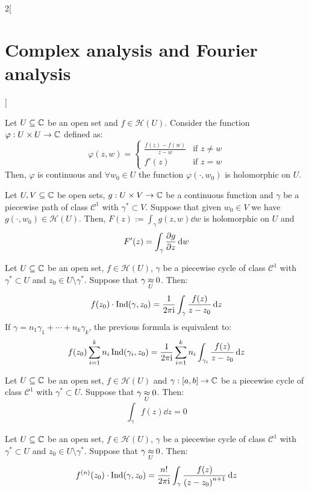 \documentclass[../../../main.tex]{subfiles}
\begin{document}
\begin{multicols}{2}[\section{Complex analysis and Fourier analysis}]
  \begin{lemma}
    Let $U\subseteq\mathbb{C}$ be an open set and $f\in\mathcal{H}(U)$. Consider the function $\varphi:U\times U\rightarrow\mathbb{C}$ defined as:
    $$
      \varphi(z,w)=
      \begin{cases}
        \frac{f(z)-f(w)}{z-w} & \text{if }z\ne w \\
        f'(z)                 & \text{if }z=w
      \end{cases}
    $$
    Then, $\varphi$ is continuous and $\forall w_0\in U$ the function $\varphi(\cdot,w_0)$ is holomorphic on $U$.
  \end{lemma}
  \begin{lemma}
    Let $U,V\subseteq\mathbb{C}$ be open sets, $g:U\times V\rightarrow\mathbb{C}$ be a continuous function and $\gamma$ be a piecewise path of class $\mathcal{C}^1$ with $\gamma^*\subset V$. Suppose that given $w_0\in V$ we have $g(\cdot,w_0)\in\mathcal{H}(U)$. Then, $F(z):=\int_\gamma g(z,w)\dd{w}$ is holomorphic on $U$ and $$F'(z)=\int_\gamma\pdv{g}{z}(z,w)\dd{w}$$
  \end{lemma}
  \begin{theorem}
    Let $U\subseteq\mathbb{C}$ be an open set, $f\in\mathcal{H}(U)$, $\gamma$ be a piecewise cycle of class $\mathcal{C}^1$ with $\gamma^*\subset U$ and $z_0\in U\setminus\gamma^*$. Suppose that $\gamma\mathbin{\underset{U}{\approx}} 0$. Then:
    $$f(z_0)\cdot\operatorname{Ind}(\gamma,z_0)=\frac{1}{2\pi\mathrm{i}}\int_\gamma\frac{f(z)}{z-z_0}\dd{z}$$
    If $\gamma=n_1\gamma_1+\cdots+n_k\gamma_k$, the previous formula is equivalent to:
    $$f(z_0)\sum_{i=1}^kn_i\operatorname{Ind}(\gamma_i,z_0)=\frac{1}{2\pi\mathrm{i}}\sum_{i=1}^kn_i\int_{\gamma_i}\frac{f(z)}{z-z_0}\dd{z}$$
  \end{theorem}
  \begin{theorem}
    Let $U\subseteq \mathbb{C}$ be an open set, $f\in\mathcal{H}(U)$ and $\gamma:[a,b]\rightarrow\mathbb{C}$ be a piecewise cycle of class $\mathcal{C}^1$ with $\gamma^*\subset U$. Suppose that $\gamma\mathbin{\underset{U}{\approx}} 0$. Then: $$\int_\gamma f(z)\dd{z}=0$$
  \end{theorem}
  \begin{corollary}
    Let $U\subseteq\mathbb{C}$ be an open set, $f\in\mathcal{H}(U)$, $\gamma$ be a piecewise cycle of class $\mathcal{C}^1$ with $\gamma^*\subset U$ and $z_0\in U\setminus\gamma^*$. Suppose that $\gamma\mathbin{\underset{U}{\approx}} 0$. Then:
    $$f^{(n)}(z_0)\cdot\operatorname{Ind}(\gamma,z_0)=\frac{n!}{2\pi\mathrm{i}}\int_\gamma\frac{f(z)}{{(z-z_0)}^{n+1}}\dd{z}$$
  \end{corollary}

\end{multicols}
\end{document}
